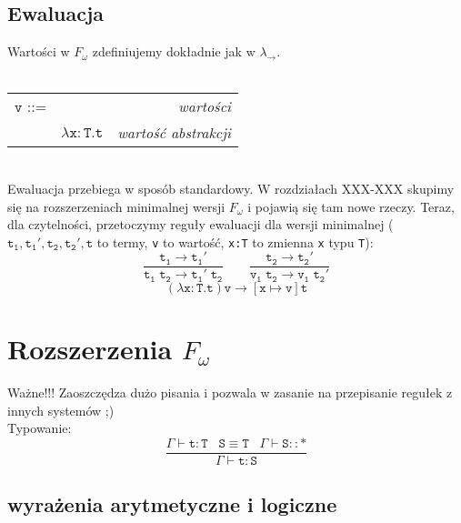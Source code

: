 \documentclass[11pt,leqno]{article}
\begin{document}
\subsection{Ewaluacja}

Wartości w $F_\omega$ zdefiniujemy dokładnie jak w $\lambda_{\rightarrow}$. \\ \\
\begin{tabular}{| l c r |}
  \hline
  $\mathtt{v}$ ::= &  & \textit{wartości}  \\
   & $\mathtt{\lambda x:T.t}$ & \textit{wartość abstrakcji} \\
  \hline
\end{tabular} \\

Ewaluacja przebiega w sposób standardowy. W rozdziałach XXX-XXX skupimy się na rozszerzeniach minimalnej wersji $F_\omega$ i pojawią się tam nowe rzeczy. Teraz, dla czytelności, przetoczymy reguły ewaluacji dla wersji minimalnej ($\mathtt{t_1,t_1',t_2,t_2',t}$ to termy, \texttt{v} to wartość, \texttt{x:T} to zmienna \texttt{x} typu \texttt{T}):
	\[\mathtt{
		\frac{t_1 \longrightarrow t_1'}{t_1\;t_2 \longrightarrow t_1'\;t_2}
                \qquad
                \frac{t_2 \longrightarrow t_2'}{v_1\;t_2 \longrightarrow v_1\;t_2'}}
	\]
 	\[\mathtt{
		(\lambda x:T.t)v \longrightarrow [x \mapsto v]t}
	\]


\section{Rozszerzenia $F_\omega$}
\setcounter{equation}{0}
Ważne!!! Zaoszczędza dużo pisania i pozwala w zasanie na przepisanie regułek z innych systemów ;) \\
Typowanie:
 	\[\mathtt{ \frac{\Gamma \vdash t:T \;\;\; S\equiv T \;\;\; \Gamma \vdash S::\ast}{\Gamma \vdash t:S}
		}
	\]

\subsection{wyrażenia arytmetyczne i logiczne}
\end{document}
